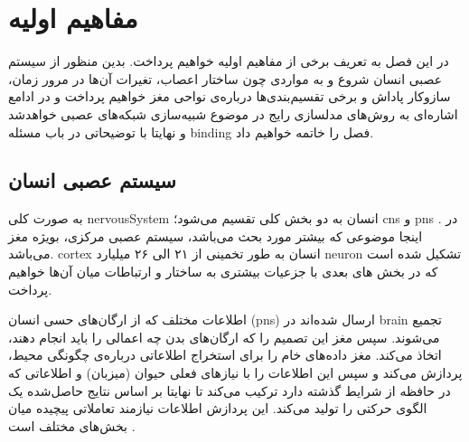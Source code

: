 \documentclass[12pt]{report}
\begin{document}
	
	
	
	\tableofcontents
	
	
	
	\chapter{مفاهیم اولیه}
	\label{ch:Defs}
	\pagestyle{plain}
	\setcounter{page}{1}
	
	در این فصل به تعریف برخی از مفاهیم اولیه خواهیم پرداخت. بدین منظور از سیستم عصبی انسان شروع و به مواردی چون ساختار اعصاب، تغیرات آن‌ها در مرور زمان، سازوکار پاداش و برخی تقسیم‌بندی‌ها درباره‌ی نواحی مغز خواهیم پرداخت و در ادامع اشاره‌ای به روش‌‌های مدلسازی رایج در موضوع شبیه‌سازی شبکه‌های عصبی خواهدشد و نهایتا با توضیحاتی در باب مسئله \gls{binding} فصل را خاتمه خواهیم داد.
	
	\section{سیستم عصبی انسان}
	
	به صورت کلی \gls{nervousSystem} انسان به دو بخش کلی تقسیم می‌شود؛ \gls{cns}
	و \gls{pns}
	.
	در اینجا موضوعی که بیشتر مورد بحث می‌باشد، سیستم عصبی مرکزی، بویژه مغز می‌باشد. \gls{cortex} انسان به طور تخمینی از ۲۱ الی ۲۶ میلیارد \gls{neuron} تشکیل شده است
	\cite{Pelvig2008-vh}
	که در بخش های بعدی با جزعیات بیشتری به ساختار و ارتباطات میان آن‌ها خواهیم پرداخت.
	
	
	اطلاعات مختلف که از ارگان‌های حسی انسان (\gls{pns}) ارسال شده‌اند در \gls{brain} تجمیع می‌شوند. سپس مغز این تصمیم را که ارگان‌های بدن چه اعمالی را باید انجام دهند، اتخاذ می‌کند. مغز داده‌های خام را برای استخراج اطلاعاتی درباره‌ی چگونگی محیط، پردازش می‌کند و سپس این اطلاعات را با نیاز‌های فعلی حیوان (میزبان) و اطلاعاتی که در حافظه از شرایط گذشته دارد ترکیب می‌کند تا نهایتا بر اساس نتایج حاصل‌شده یک الگوی حرکتی را تولید می‌کند. این پردازش اطلاعات نیازمند تعاملاتی پیچیده میان بخش‌های مختلف است 
	\cite{carew2000}.
	
\end{document}
